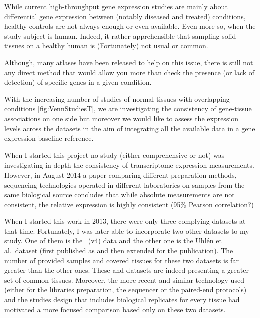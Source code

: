 While current high-throughput gene expression studies are mainly about
differential gene expression between (notably diseased and treated) conditions,
healthy controls are not always enough or even available. Even more so, when the
study subject is human. Indeed, it rather apprehensible that sampling solid
tissues on a healthy human is (Fortunately) not usual or common.

Although, many atlases have been released to help on this issue,
there is still not any direct method that would allow you more than check the
presence (or lack of detection) of specific genes in a given condition.

With the increasing number of studies of normal tissues with overlapping conditions
\cref{fig:VennStudiesT}, we are investigating the consistency of gene-tissue
associations on one side but moreover we would like to assess the expression
levels across the datasets in the aim of integrating all the available data in a
gene expression baseline reference.

When I started this project no study (either comprehensive or not) was
investigating in-depth the consistency of transcriptome expression measurements.
However, in August 2014 a paper comparing different preparation methods,
sequencing technologies operated in different laboratories
on samples from the same biological source concludes that while absolute
measurements are not consistent, the relative expression is highly consistent
(95\% Pearson correlation?)

\begin{comment}
The main question when I started this project was to appraise how much consistent
(robust) is the \Rnaseq\ technology to quantify the gene expression. While it
is comparable to microarrays for differential gene expression analysis study
\TK{add reference},
\Rnaseq\ plus: detect new things - minus: sampling problems (stuff might be there
but won't be ``fished''.
\end{comment}

When I started this work in 2013, there were only three complying
datasets at that time. Fortunately, I was later
able to incorporate two other datasets to my study. One of them is the \Gtex\
(v4) data and the other one is the Uhlén et al.\ dataset (first
published as \citet{Uhlen2014} and then extended for the \citet{Uhlen2015} publication).
The number of provided samples and covered tissues for these two datasets
is far greater than the other ones. These \dataset{\Gtex} and 
datasets are indeed presenting a greater set of common tissues. Moreover,
the more recent and similar technology used (either for the libraries preparation,
the sequencer or the paired-end protocols) and the studies design that includes
biological replicates for every tissue had motivated a more focused comparison
based only on these two datasets.

